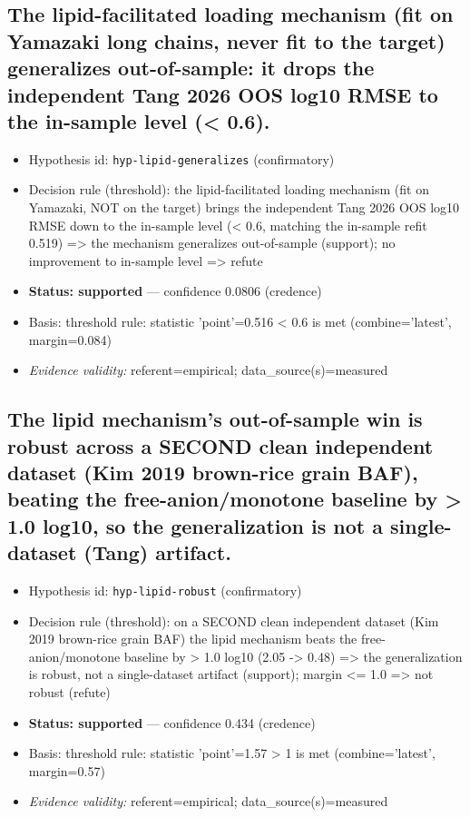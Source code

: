 \documentclass{article}
\begin{document}
\subsection{The lipid-facilitated loading mechanism (fit on Yamazaki long chains, never fit to the target) generalizes out-of-sample: it drops the independent Tang 2026 OOS log10 RMSE to the in-sample level (< 0.6).}
\begin{itemize}
  \item Hypothesis id: \texttt{hyp-lipid-generalizes} (confirmatory)
  \item Decision rule (threshold): the lipid-facilitated loading mechanism (fit on Yamazaki, NOT on the target) brings the independent Tang 2026 OOS log10 RMSE down to the in-sample level (< 0.6, matching the in-sample refit 0.519) => the mechanism generalizes out-of-sample (support); no improvement to in-sample level => refute
  \item \textbf{Status: supported} --- confidence 0.0806 (credence)
  \item Basis: threshold rule: statistic 'point'=0.516 < 0.6 is met (combine='latest', margin=0.084)
  \item \textit{Evidence validity:} referent=empirical; data\_source(s)=measured
\end{itemize}

\subsection{The lipid mechanism's out-of-sample win is robust across a SECOND clean independent dataset (Kim 2019 brown-rice grain BAF), beating the free-anion/monotone baseline by > 1.0 log10, so the generalization is not a single-dataset (Tang) artifact.}
\begin{itemize}
  \item Hypothesis id: \texttt{hyp-lipid-robust} (confirmatory)
  \item Decision rule (threshold): on a SECOND clean independent dataset (Kim 2019 brown-rice grain BAF) the lipid mechanism beats the free-anion/monotone baseline by > 1.0 log10 (2.05 -> 0.48) => the generalization is robust, not a single-dataset artifact (support); margin <= 1.0 => not robust (refute)
  \item \textbf{Status: supported} --- confidence 0.434 (credence)
  \item Basis: threshold rule: statistic 'point'=1.57 > 1 is met (combine='latest', margin=0.57)
  \item \textit{Evidence validity:} referent=empirical; data\_source(s)=measured
\end{itemize}
\end{document}
